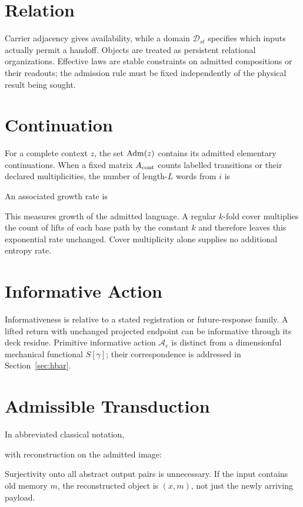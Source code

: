 \section{Relation}\label{sec:relation}

Carrier adjacency gives availability, while a domain $\mathcal D_{st}$ specifies which inputs actually permit a handoff. Objects are treated as persistent relational organizations. Effective laws are stable constraints on admitted compositions or their readouts; the admission rule must be fixed independently of the physical result being sought.




\section{Continuation}

For a complete context $z$, the set $\operatorname{Adm}(z)$ contains its admitted elementary continuations. When a fixed matrix $A_{\rm cont}$ counts labelled transitions or their declared multiplicities, the number of length-$L$ words from $i$ is

An associated growth rate is

This measures growth of the admitted language. A regular $k$-fold cover multiplies the count of lifts of each base path by the constant $k$ and therefore leaves this exponential rate unchanged. Cover multiplicity alone supplies no additional entropy rate.

\section{Informative Action}\label{sec:action}

Informativeness is relative to a stated registration or future-response family. A lifted return with unchanged projected endpoint can be informative through its deck residue. Primitive informative action $\mathcal A_e$ is distinct from a dimensionful mechanical functional $S[\gamma]$; their correspondence is addressed in Section~\ref{sec:hbar}.




\section{Admissible Transduction}\label{sec:transduction}

In abbreviated classical notation,

with reconstruction on the admitted image:

Surjectivity onto all abstract output pairs is unnecessary. If the input contains old memory $m$, the reconstructed object is $(x,m)$, not just the newly arriving payload.

